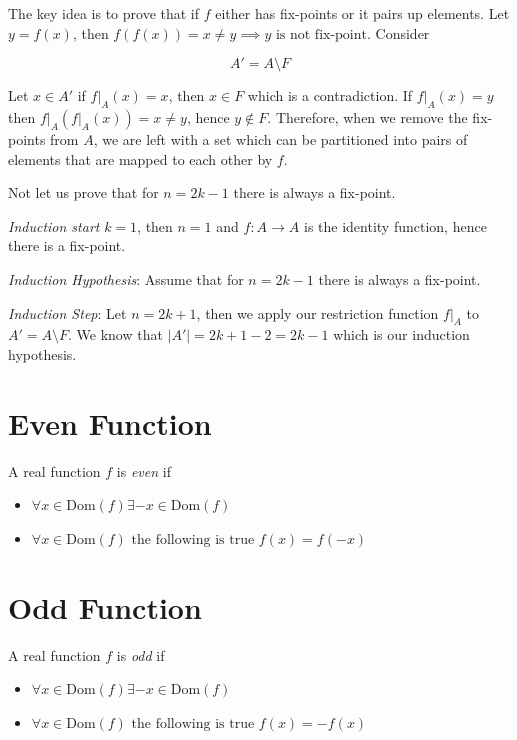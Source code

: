 The key idea is to prove that if \(f\) either has fix-points or it pairs up elements. Let \(y = f(x)\), then
\(f(f(x)) = x \neq y \implies y \text{ is not fix-point}\). Consider

\[
	A' = A \setminus F
\]


Let \(x \in A'\) if \(f|_A (x) = x\), then \(x \in F\) which is a contradiction. If \(f|_A (x) = y\) then \(f|_A(f|_A(x)) = x \neq y\), hence \(y \notin F\).
Therefore, when we remove the fix-points from \(A\), we are left with a set which can be partitioned into pairs of elements that are mapped to each other by \(f\).

Not let us prove that for \(n = 2k - 1\) there is always a fix-point.

\emph{Induction start} \(k = 1\), then \(n = 1\) and \(f: A \to A\) is the identity function, hence there is a fix-point.

\emph{Induction Hypothesis}: Assume that for \(n = 2k - 1\) there is always a fix-point.

\emph{Induction Step}: Let \(n = 2k + 1\), then we apply our restriction function \(f|_A\) to \(A' = A \setminus F\). We know
that \(|A'| = 2k + 1 - 2 = 2k - 1\) which is our induction hypothesis.

\section{Even Function}

A real function \(f\) is \emph{even} if

\begin{itemize}

	\item \(\forall x \in \text{Dom}(f) \exists -x \in \text{Dom}(f)\)

	\item \(\forall x \in \text{Dom}(f) \text{ the following is true } f(x) = f(-x)\)

\end{itemize}

\section{Odd Function}

A real function \(f\) is \emph{odd} if

\begin{itemize}

	\item \(\forall x \in \text{Dom}(f) \exists -x \in \text{Dom}(f)\)

	\item \(\forall x \in \text{Dom}(f) \text{ the following is true } f(x) = - f(x)\)

\end{itemize}

